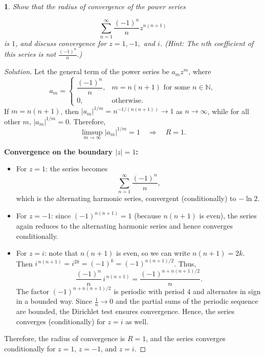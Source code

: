 \documentclass[12pt, a4paper]{report}
\theoremstyle{spaced}
\newtheorem{exercise}{}
\newcommand{\setexercise}[1]{\setcounter{exercise}{#1-1}}
\begin{document}
\setexercise{7}
\begin{exercise}
	Show that the radius of convergence of the power series

	\[
		\sum_{n=1}^{\infty} \frac{(-1)^n}{n} z^{n(n+1)}
	\]
	is $1$, and discuss convergence for $z = 1, -1,$ and $i$.
	(Hint: The $n$th coefficient of this series is not $\displaystyle \frac{(-1)^n}{n}.$)
\end{exercise}

\begin{proof}[Solution]
	Let the general term of the power series be $a_m z^m$, where
	\[
		a_m =
		\begin{cases}
			\dfrac{(-1)^n}{n}, & m = n(n+1) \text{ for some } n \in \mathbb{N}, \\[6pt]
			0,                 & \text{otherwise}.
		\end{cases}
	\]
	If $m = n(n+1)$, then $|a_m|^{1/m} = n^{-1/(n(n+1))} \to 1$ as $n \to \infty$, while for all other $m$, $|a_m|^{1/m} = 0$.
	Therefore,
	\[
		\limsup_{m \to \infty} |a_m|^{1/m} = 1 \quad \Longrightarrow \quad R = 1.
	\]

	\smallskip
	\textbf{Convergence on the boundary $|z|=1$:}
	\begin{itemize}
		\item For $z = 1$: the series becomes
		      \[
			      \sum_{n=1}^{\infty} \frac{(-1)^n}{n},
		      \]
		      which is the alternating harmonic series, convergent (conditionally) to $-\ln 2$.

		\item For $z = -1$: since $(-1)^{n(n+1)} = 1$ (because $n(n+1)$ is even), the series again reduces to the alternating harmonic series and hence converges conditionally.

		\item For $z = i$: note that $n(n+1)$ is even, so we can write $n(n+1) = 2k$. Then $i^{\,n(n+1)} = i^{2k} = (-1)^k = (-1)^{n(n+1)/2}$.
		      Thus,
		      \[
			      \frac{(-1)^n}{n} \, i^{\,n(n+1)} = \frac{(-1)^{n + n(n+1)/2}}{n}.
		      \]
		      The factor $(-1)^{n + n(n+1)/2}$ is periodic with period $4$ and alternates in sign in a bounded way.
		      Since $\frac{1}{n} \to 0$ and the partial sums of the periodic sequence are bounded, the Dirichlet test ensures convergence.
		      Hence, the series converges (conditionally) for $z = i$ as well.
	\end{itemize}

	\noindent Therefore, the radius of convergence is $R = 1$, and the series converges conditionally for $z = 1$, $z = -1$, and $z = i$.
\end{proof}
\end{document}
